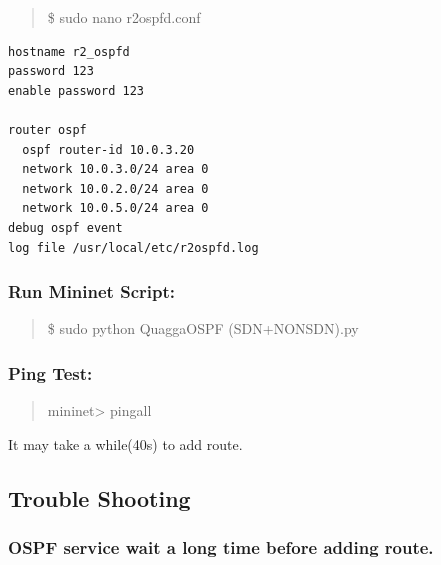 \begin{quote}
\$ sudo nano r2ospfd.conf
\end{quote}

\begin{adjustwidth}{1cm}{0cm}
\begin{verbatim}
hostname r2_ospfd
password 123
enable password 123

router ospf
  ospf router-id 10.0.3.20
  network 10.0.3.0/24 area 0
  network 10.0.2.0/24 area 0
  network 10.0.5.0/24 area 0
debug ospf event
log file /usr/local/etc/r2ospfd.log
\end{verbatim}
\end{adjustwidth}

\subsubsection{Run Mininet Script:}\label{run-mininet-script}

\begin{quote}
\$ sudo python QuaggaOSPF (SDN+NONSDN).py
\end{quote}

\subsubsection{Ping Test:}\label{ping-test-2}

\begin{quote}
mininet\textgreater{} pingall
\end{quote}

It may take a while(40s) to add route.

\subsection{Trouble Shooting}\label{trouble-shooting}

\subsubsection{OSPF service wait a long time before adding
route.}\label{ospf-service-wait-a-long-time-before-adding-route.}
